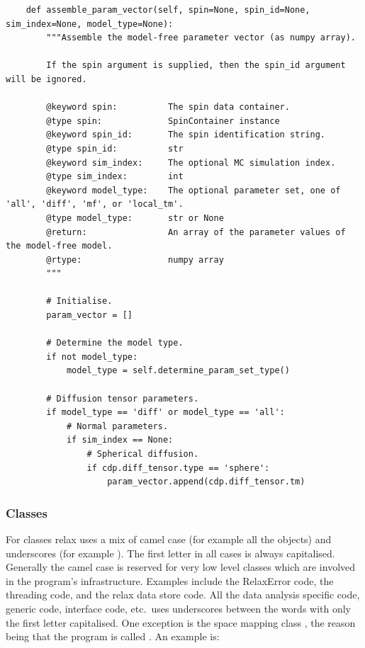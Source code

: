 \begin{lstlisting}
    def assemble_param_vector(self, spin=None, spin_id=None, sim_index=None, model_type=None):
        """Assemble the model-free parameter vector (as numpy array).

        If the spin argument is supplied, then the spin_id argument will be ignored.

        @keyword spin:          The spin data container.
        @type spin:             SpinContainer instance
        @keyword spin_id:       The spin identification string.
        @type spin_id:          str
        @keyword sim_index:     The optional MC simulation index.
        @type sim_index:        int
        @keyword model_type:    The optional parameter set, one of 'all', 'diff', 'mf', or 'local_tm'. 
        @type model_type:       str or None
        @return:                An array of the parameter values of the model-free model.
        @rtype:                 numpy array
        """

        # Initialise.
        param_vector = []

        # Determine the model type.
        if not model_type:
            model_type = self.determine_param_set_type()

        # Diffusion tensor parameters.
        if model_type == 'diff' or model_type == 'all':
            # Normal parameters.
            if sim_index == None:
                # Spherical diffusion.
                if cdp.diff_tensor.type == 'sphere':
                    param_vector.append(cdp.diff_tensor.tm)
\end{lstlisting}



\subsubsection{Classes}

For classes relax uses a mix of camel case (for example all the  objects) and underscores (for example ).
The first letter in all cases is always capitalised.
Generally the camel case is reserved for very low level classes which are involved in the program's infrastructure.
Examples include the RelaxError code, the threading code, and the relax data store code.
All the data analysis specific code, generic code, interface code, etc.\ uses underscores between the words with only the first letter capitalised.
One exception is the space mapping class , the reason being that the program is called .
An example is:

